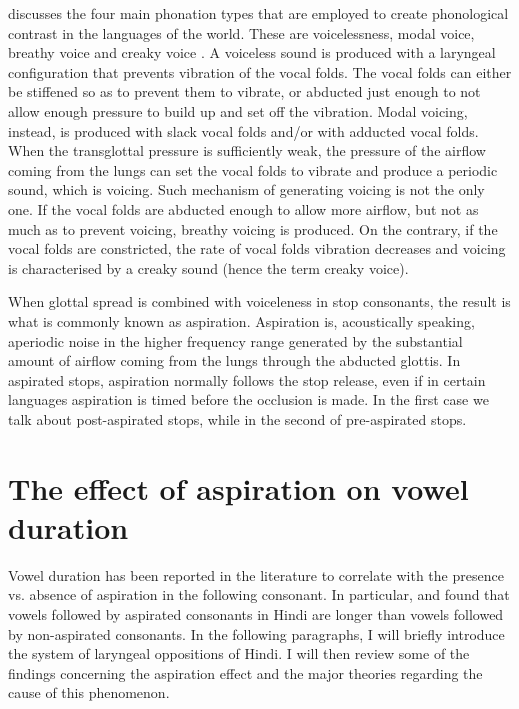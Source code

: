 \documentclass[11pt,a4paper,openany]{memoir}\usepackage[]{graphicx}\usepackage[]{color}
\begin{document}
\citet{ladefoged1973} discusses the four main phonation types that are employed to create phonological contrast in the languages of the world.
These are voicelessness, modal voice, breathy voice and creaky voice \citep{halle2002}.
A voiceless sound is produced with a laryngeal configuration that prevents vibration of the vocal folds.
The vocal folds can either be stiffened so as to prevent them to vibrate, or abducted just enough to not allow enough pressure to build up and set off the vibration.
Modal voicing, instead, is produced with slack vocal folds and/or with adducted vocal folds.
When the transglottal pressure is sufficiently weak, the pressure of the airflow coming from the lungs can set the vocal folds to vibrate and produce a periodic sound, which is voicing.
Such mechanism of generating voicing is not the only one.
If the vocal folds are abducted enough to allow more airflow, but not as much as to prevent voicing, breathy voicing is produced.
On the contrary, if the vocal folds are constricted, the rate of vocal folds vibration decreases and voicing is characterised by a creaky sound (hence the term creaky voice).

When glottal spread is combined with voiceleness in stop consonants, the result is what is commonly known as aspiration.
Aspiration is, acoustically speaking, aperiodic noise in the higher frequency range generated by the substantial amount of airflow coming from the lungs through the abducted glottis.
In aspirated stops, aspiration normally follows the stop release, even if in certain languages aspiration is timed before the occlusion is made.
In the first case we talk about post-aspirated stops, while in the second of pre-aspirated stops.


\section{The effect of aspiration on vowel duration}
\label{s:aspiration}

Vowel duration has been reported in the literature to correlate with the presence vs. absence of aspiration in the following consonant.
In particular, \citet{maddieson1976} and \citet{durvasula2012} found that vowels followed by aspirated consonants in Hindi are longer than vowels followed by non-aspirated consonants.
In the following paragraphs, I will briefly introduce the system of laryngeal oppositions of Hindi.
I will then review some of the findings concerning the aspiration effect and the major theories regarding the cause of this phenomenon.
\end{document}
